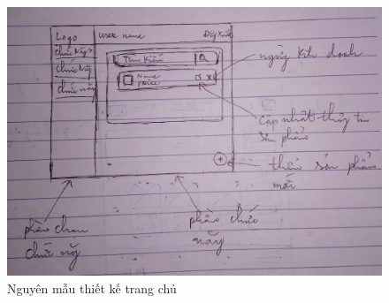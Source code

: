 \begin{enumerate}[label=\textbf{\alph*)}]
\begin{figure}[h!]
            \includegraphics[width=\linewidth]{fig/p_dashboard.jpg}
            \caption{Nguyên mẫu thiết kế trang chủ}
        \end{figure}
\end{enumerate}
